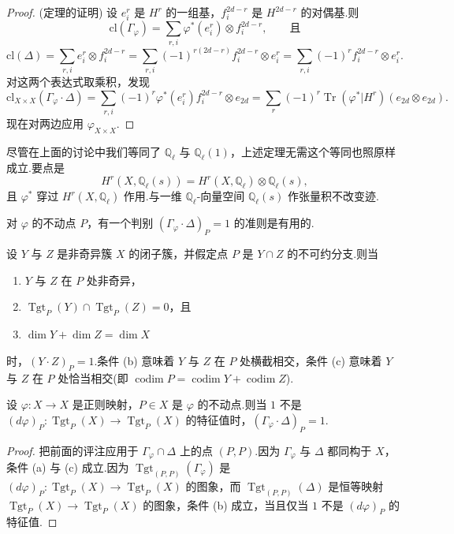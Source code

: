 \begin{proof}
(定理的证明) 设 $e^{r}_i$ 是 $H^{r}$ 的一组基，$f^{2d-r}_i$ 是 $H^{2d-r}$ 的对偶基.则
\[
\mathrm{cl}(\Gamma_{\varphi}) = \sum_{r, i} \varphi^{*}(e^{r}_i) \otimes f^{2d-r}_i, \qquad \text{且}
\]
\[
\mathrm{cl}(\Delta) = \sum_{r, i} e^{r}_i \otimes f^{2d-r}_i = \sum_{r, i} (-1)^{r(2d-r)} f^{2d-r}_i \otimes e^{r}_i = \sum_{r, i} (-1)^{r} f^{2d-r}_i \otimes e^{r}_i.
\]
对这两个表达式取乘积，发现
\[
\mathrm{cl}_{X \times X}(\Gamma_{\varphi} \cdot \Delta) = \sum_{r, i} (-1)^{r} \varphi^{*}(e^{r}_i) f^{2d-r}_i \otimes e_{2d} = \sum_{r} (-1)^{r}\operatorname{Tr}(\varphi^{*}|H^{r})(e_{2d} \otimes e_{2d}).
\]
现在对两边应用 $\varphi_{X \times X}$.
\end{proof}

\begin{remark}\label{rem:25.5}
尽管在上面的讨论中我们等同了 $\mathbb{Q}_{\ell}$ 与 $\mathbb{Q}_{\ell}(1)$，上述定理无需这个等同也照原样成立.要点是
\[
H^{r}(X, \mathbb{Q}_{\ell}(s)) = H^{r}(X, \mathbb{Q}_{\ell}) \otimes \mathbb{Q}_{\ell}(s),
\]
且 $\varphi^{*}$ 穿过 $H^{r}(X, \mathbb{Q}_{\ell})$ 作用.与一维 $\mathbb{Q}_{\ell}$-向量空间 $\mathbb{Q}_{\ell}(s)$ 作张量积不改变迹.
\end{remark}

对 $\varphi$ 的不动点 $P$，有一个判别 $(\Gamma_{\varphi} \cdot \Delta)_P = 1$ 的准则是有用的.

设 $Y$ 与 $Z$ 是非奇异簇 $X$ 的闭子簇，并假定点 $P$ 是 $Y \cap Z$ 的不可约分支.则当
\begin{enumerate}
  \item $Y$ 与 $Z$ 在 $P$ 处非奇异，
  \item $\operatorname{Tgt}_{P}(Y) \cap \operatorname{Tgt}_{P}(Z) = 0$，且
  \item $\dim Y + \dim Z = \dim X$
\end{enumerate}
时，$(Y \cdot Z)_P = 1$.条件 (b) 意味着 $Y$ 与 $Z$ 在 $P$ 处横截相交，条件 (c) 意味着 $Y$ 与 $Z$ 在 $P$ 处恰当相交(即 $\operatorname{codim} P = \operatorname{codim} Y + \operatorname{codim} Z$).

\begin{lemma}\label{lem:25.6}
设 $\varphi \colon X \to X$ 是正则映射，$P \in X$ 是 $\varphi$ 的不动点.则当 $1$ 不是 $(d\varphi)_P \colon \operatorname{Tgt}_{P}(X) \to \operatorname{Tgt}_{P}(X)$ 的特征值时，$(\Gamma_{\varphi} \cdot \Delta)_P = 1$.
\end{lemma}

\begin{proof}
把前面的评注应用于 $\Gamma_{\varphi} \cap \Delta$ 上的点 $(P, P)$.因为 $\Gamma_{\varphi}$ 与 $\Delta$ 都同构于 $X$，条件 (a) 与 (c) 成立.因为 $\operatorname{Tgt}_{(P,P)}(\Gamma_{\varphi})$ 是 $(d\varphi)_P \colon \operatorname{Tgt}_{P}(X) \to \operatorname{Tgt}_{P}(X)$ 的图象，而 $\operatorname{Tgt}_{(P,P)}(\Delta)$ 是恒等映射 $\operatorname{Tgt}_{P}(X) \to \operatorname{Tgt}_{P}(X)$ 的图象，条件 (b) 成立，当且仅当 $1$ 不是 $(d\varphi)_P$ 的特征值.
\end{proof}
